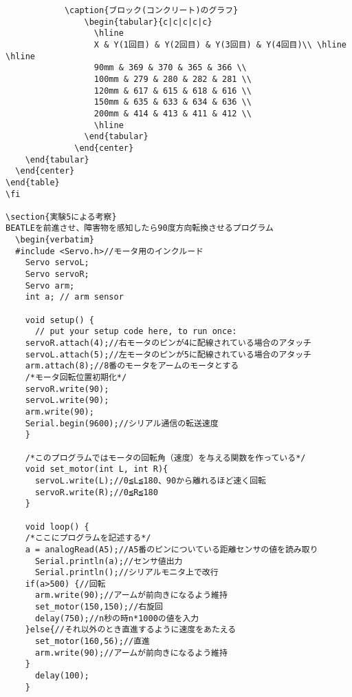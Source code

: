 \documentclass{jsarticle}
\begin{document}
\begin{verbatim}
            \caption{ブロック(コンクリート)のグラフ}
                \begin{tabular}{c|c|c|c|c}
                  \hline
                  X & Y(1回目) & Y(2回目) & Y(3回目) & Y(4回目)\\ \hline \hline
                  90mm & 369 & 370 & 365 & 366 \\
                  100mm & 279 & 280 & 282 & 281 \\
                  120mm & 617 & 615 & 618 & 616 \\
                  150mm & 635 & 633 & 634 & 636 \\
                  200mm & 414 & 413 & 411 & 412 \\
                  \hline
                \end{tabular}
              \end{center}
    \end{tabular}
  \end{center}
\end{table}
\fi

\section{実験5による考察}
BEATLEを前進させ、障害物を感知したら90度方向転換させるプログラム
  \begin{verbatim}
  #include <Servo.h>//モータ用のインクルード
    Servo servoL;
    Servo servoR;
    Servo arm;
    int a; // arm sensor

    void setup() {
      // put your setup code here, to run once:
    servoR.attach(4);//右モータのピンが4に配線されている場合のアタッチ
    servoL.attach(5);//左モータのピンが5に配線されている場合のアタッチ
    arm.attach(8);//8番のモータをアームのモータとする
    /*モータ回転位置初期化*/
    servoR.write(90);
    servoL.write(90);
    arm.write(90);
    Serial.begin(9600);//シリアル通信の転送速度
    }

    /*このプログラムではモータの回転角（速度）を与える関数を作っている*/
    void set_motor(int L, int R){
      servoL.write(L);//0≦L≦180、90から離れるほど速く回転
      servoR.write(R);//0≦R≦180
    }

    void loop() {
    /*ここにプログラムを記述する*/
    a = analogRead(A5);//A5番のピンについている距離センサの値を読み取り
      Serial.println(a);//センサ値出力
      Serial.println();//シリアルモニタ上で改行
    if(a>500) {//回転
      arm.write(90);//アームが前向きになるよう維持
      set_motor(150,150);//右旋回
      delay(750);//n秒の時n*1000の値を入力
    }else{//それ以外のとき直進するように速度をあたえる
      set_motor(160,56);//直進
      arm.write(90);//アームが前向きになるよう維持
    }
      delay(100);
    }

  \end{verbatim}
\end{document}
